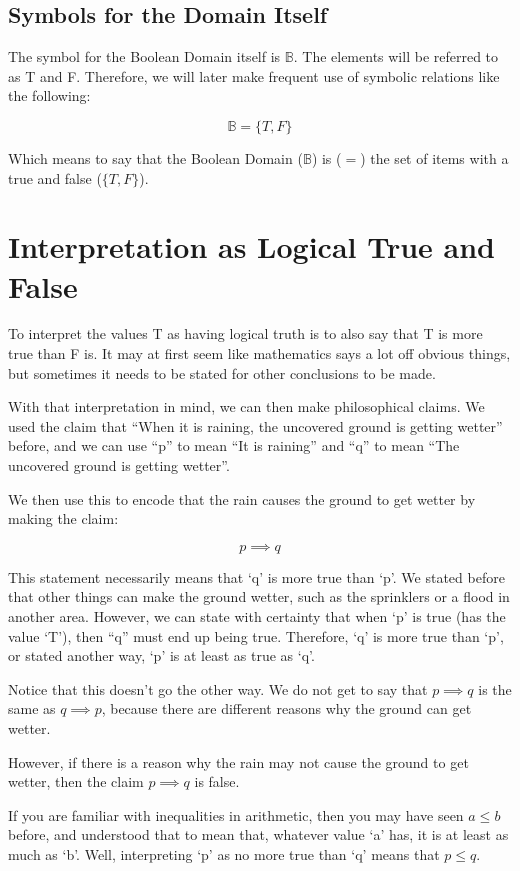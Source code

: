 \subsection{Symbols for the Domain Itself}

The symbol for the Boolean Domain itself is $\mathbb{B}$. The elements will be referred to as T and F. Therefore, we will later make frequent use of symbolic relations like the following:

$$
    \mathbb{B} = \{T, F\}
$$

Which means to say that the Boolean Domain ($\mathbb{B}$) is ($=$) the set of items with a true and false ($\{T, F\}$).

\section{Interpretation as Logical True and False}
To interpret the values T as having logical truth is to also say that T is more true than F is. It may at first seem like mathematics says a lot off obvious things, but sometimes it needs to be stated for other conclusions to be made.

With that interpretation in mind, we can then make philosophical claims. We used the claim that ``When it is raining, the uncovered ground is getting wetter'' before, and we can use ``p'' to mean ``It is raining'' and ``q'' to mean ``The uncovered ground is getting wetter''.

We then use this to encode that the rain causes the ground to get wetter by making the claim:

$$
p \implies q
$$

This statement necessarily means that `q' is more true than `p'. We stated before that other things can make the ground wetter, such as the sprinklers or a flood in another area. However, we can state with certainty that when `p' is true (has the value `T'), then ``q'' must end up being true. Therefore, `q' is more true than `p', or stated another way, `p' is at least as true as `q'.

Notice that this doesn't go the other way. We do not get to say that $ p \implies q $ is the same as $ q \implies p $, because there are different reasons why the ground can get wetter.

However, if there is a reason why the rain may not cause the ground to get wetter, then the claim $ p \implies q $ is false.

If you are familiar with inequalities in arithmetic, then you may have seen $ a \leq b $ before, and understood that to mean that, whatever value `a' has, it is at least as much as `b'. Well, interpreting `p' as no more true than `q' means that $ p \leq q $.

